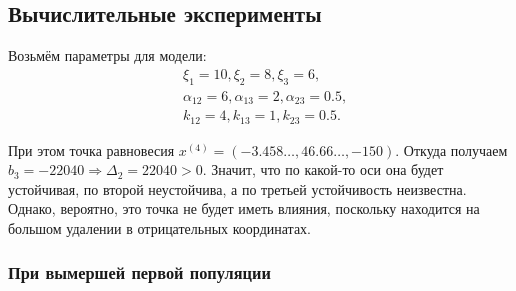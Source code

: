 \subsection{Вычислительные эксперименты}
    Возьмём параметры для модели:
    \[
        \begin{split}
            & \xi_1 = 10, \xi_2 = 8, \xi_3 = 6, \\
            & \alpha_{12} = 6, \alpha_{13} = 2, \alpha_{23} = 0.5, \\
            & k_{12} = 4, k_{13} = 1, k_{23} = 0.5.
        \end{split}
    \]

    При этом точка равновесия \( x^{(4)} = ( -3.458\dots, 46.66\dots, -150 ) \). Откуда получаем \( b_3 = -22040 \Rightarrow \Delta_2 = 22040 > 0 \). Значит, что по какой-то оси она будет устойчивая, по второй неустойчива, а по третьей устойчивость неизвестна. Однако, вероятно, это точка не будет иметь влияния, поскольку находится на большом удалении в отрицательных координатах.

    \subsubsection{При вымершей первой популяции}

